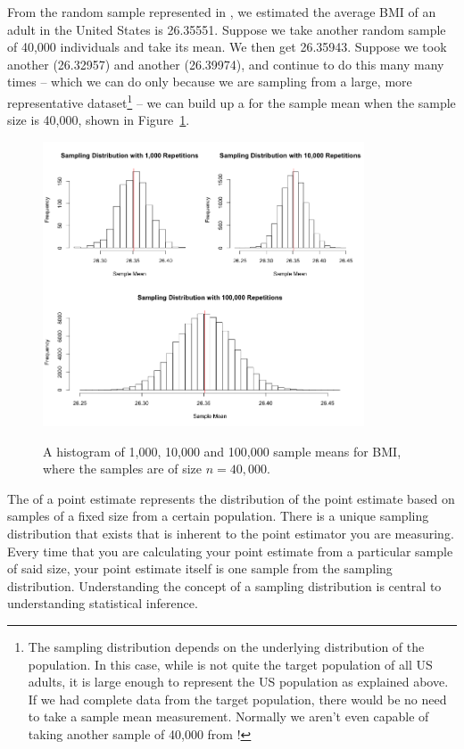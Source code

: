From the random sample represented in , we estimated the average BMI of an adult in the United States is 26.35551. Suppose we take another random sample of 40,000 individuals and take its mean. We then get 26.35943. Suppose we took another (26.32957) and another (26.39974), and continue to do this many many times -- which we can do only because we are sampling from a large, more representative  dataset\footnote{The sampling distribution depends on the underlying distribution of the population. In this case, while  is not quite the target population of all US adults, it is large enough to represent the US population as explained above. If we had complete data from the target population, there would be no need to take a sample mean measurement. Normally we aren't even capable of taking another sample of 40,000 from !} -- we can build up a  for the sample mean when the sample size is 40,000, shown in Figure~\ref{netBMISamplingDistribution}.

\begin{figure}
   \centering
   \includegraphics[width=0.85\textwidth]{ch_inference_foundations_oi_biostat/figures/netTime1000SamplingDistribution/netBMISamplingDistribution}
   \label{netBMISamplingDistribution}
   \caption{A histogram of 1,000, 10,000 and 100,000 sample means for BMI, where the samples are of size $n=40,000$. }
\end{figure}

\begin{termBox}{
The  of a point estimate represents the distribution of the point estimate based on samples of a fixed size from a certain population. There is a unique sampling distribution that exists that is inherent to the point estimator you are measuring. Every time that you are calculating your point estimate from a particular sample of said size, your point estimate itself is one sample from the sampling distribution. Understanding the concept of a sampling distribution is central to understanding statistical inference.}
\end{termBox}

